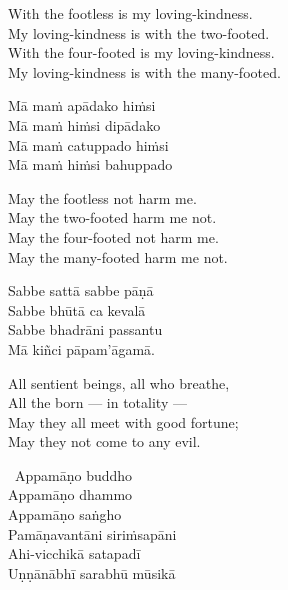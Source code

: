 \begin{english-verses}
  With the footless is my loving-kindness.\\
  My loving-kindness is with the two-footed.\\
  With the four-footed is my loving-kindness.\\
  My loving-kindness is with the many-footed.
\end{english-verses}

\begin{pali-hang-continued}
  Mā maṁ apādako hiṁsi\\
  Mā maṁ hiṁsi dipādako\\
  Mā maṁ catuppado hiṁsi\\
  Mā maṁ hiṁsi bahuppado
\end{pali-hang-continued}

\begin{english-verses}
  May the footless not harm me.\\
  May the two-footed harm me not.\\
  May the four-footed not harm me.\\
  May the many-footed harm me not.
\end{english-verses}

\begin{pali-hang-continued}
  Sabbe sattā sabbe pāṇā\\
  Sabbe bhūtā ca kevalā\\
  Sabbe bhadrāni passantu\\
  Mā kiñci pāpam'āgamā.
\end{pali-hang-continued}

\begin{english-verses}
  All sentient beings, all who breathe,\\
  All the born — in totality —\\
  May they all meet with good fortune;\\
  May they not come to any evil.
\end{english-verses}

\begin{pali-hang-continued}
  \anglebracketleft\ \hspace{-0.5mm}Appamāṇo buddho \hspace{-0.5mm}\anglebracketright\ \\
  Appamāṇo dhammo\\
  Appamāṇo saṅgho\\
  Pamāṇavantāni siriṁsapāni\\
  Ahi-vicchikā satapadī\\
  Uṇṇānābhī sarabhū mūsikā
\end{pali-hang-continued}

